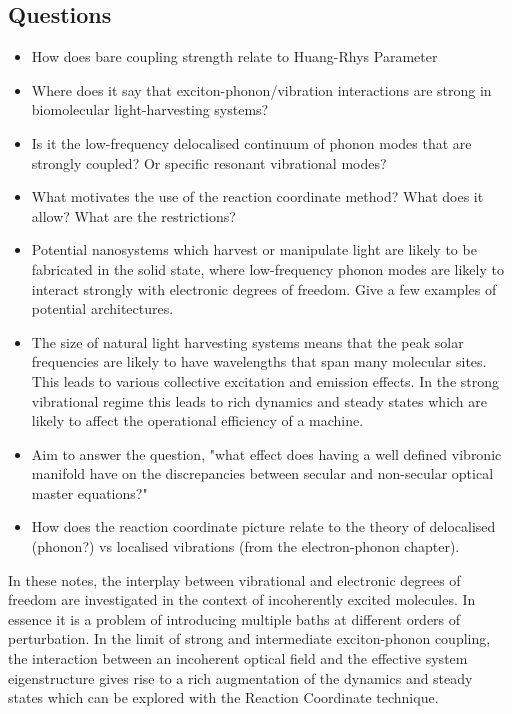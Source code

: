 \documentclass[]{article}
\begin{document}
\subsection{Questions}
\begin{itemize}
	\item How does bare coupling strength relate to Huang-Rhys Parameter
	\item Where does it say that exciton-phonon/vibration interactions are strong in biomolecular light-harvesting systems?
	\item Is it the low-frequency delocalised continuum of phonon modes that are strongly coupled? Or specific resonant vibrational modes?
	\item What motivates the use of the reaction coordinate method? What does it allow? What are the restrictions?
	\item Potential nanosystems which harvest or manipulate light are likely to be fabricated in the solid state, where low-frequency phonon modes are likely to interact strongly with electronic degrees of freedom. Give a few examples of potential architectures.
	\item The size of natural light harvesting systems means that the peak solar frequencies are likely to have wavelengths that span many molecular sites. This leads to various collective excitation and emission effects. In the strong vibrational regime this leads to rich dynamics and steady states which are likely to affect the operational efficiency of a machine.
	\item Aim to answer the question, "what effect does having a well defined vibronic manifold have on the discrepancies between secular and non-secular optical master equations?" 
	\item How does the reaction coordinate picture relate to the theory of delocalised (phonon?) vs localised vibrations (from the electron-phonon chapter). 
\end{itemize}
In these notes, the interplay between vibrational and electronic degrees of freedom are investigated in the context of incoherently excited molecules. In essence it is a problem of introducing multiple baths at different orders of perturbation. In the limit of strong and intermediate exciton-phonon coupling, the interaction between an incoherent optical field and the effective system eigenstructure gives rise to a rich augmentation of the dynamics and steady states which can be explored with the Reaction Coordinate technique.
\end{document}
